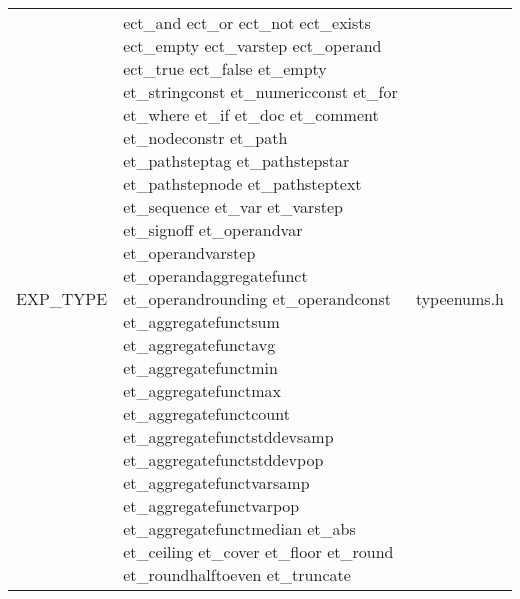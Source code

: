 \begin{tiny}
\begin{longtable}[ht]{|p{0.225\tablwidth}|p{0.375\tablwidth}|p{0.3\tablwidth}|}
  \hline EXP\_TYPE & ect\_and \newline ect\_or \newline ect\_not \newline ect\_exists \newline ect\_empty \newline
  ect\_varstep \newline ect\_operand \newline ect\_true \newline ect\_false \newline et\_empty \newline et\_stringconst \newline et\_numericconst \newline et\_for \newline et\_where \newline et\_if \newline et\_doc \newline et\_comment \newline et\_nodeconstr \newline et\_path \newline et\_pathsteptag \newline et\_pathstepstar \newline et\_pathstepnode \newline et\_pathsteptext \newline et\_sequence \newline et\_var \newline et\_varstep \newline et\_signoff \newline et\_operandvar \newline et\_operandvarstep \newline et\_operandaggregatefunct \newline et\_operandrounding \newline et\_operandconst \newline et\_aggregatefunctsum \newline et\_aggregatefunctavg \newline et\_aggregatefunctmin \newline et\_aggregatefunctmax \newline et\_aggregatefunctcount \newline et\_aggregatefunctstddevsamp \newline et\_aggregatefunctstddevpop \newline et\_aggregatefunctvarsamp \newline et\_aggregatefunctvarpop \newline et\_aggregatefunctmedian \newline et\_abs \newline et\_ceiling \newline et\_cover \newline et\_floor \newline et\_round \newline et\_roundhalftoeven \newline et\_truncate & typeenums.h \\

\end{longtable}
\end{tiny}

